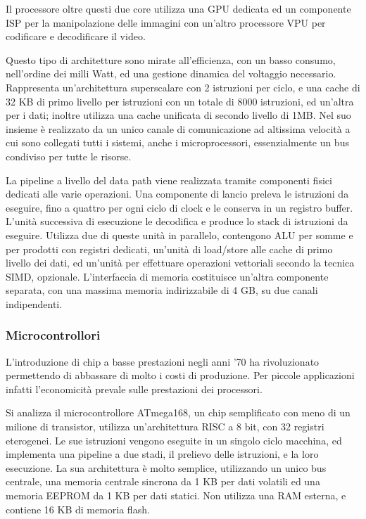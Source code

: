 \documentclass{article}
\numberwithin{equation}{subsection}
\begin{document}
Il processore oltre questi due core utilizza una GPU dedicata ed un componente ISP per la manipolazione delle immagini con un'altro processore VPU per codificare e decodificare il video. 

Questo tipo di architetture sono mirate all'efficienza, con un basso consumo, nell'ordine dei milli Watt, ed una gestione dinamica del voltaggio necessario. 
Rappresenta un'architettura superscalare con 2 istruzioni per ciclo, e una cache di 32 KB di primo livello per istruzioni con un totale di 8000 istruzioni, ed un'altra per i dati; inoltre 
utilizza una cache unificata di secondo livello di 1MB. 
Nel suo insieme è realizzato da un unico canale di comunicazione ad altissima velocità a cui sono collegati tutti i sistemi, anche i microprocessori, essenzialmente un bus condiviso per 
tutte le risorse. 

La pipeline a livello del data path viene realizzata tramite componenti fisici dedicati alle varie operazioni. Una componente di lancio preleva le istruzioni da eseguire, fino a quattro 
per ogni ciclo di clock e le conserva in un registro buffer. L'unità successiva di esecuzione le decodifica e produce lo stack di istruzioni da eseguire. Utilizza due di queste unità in 
parallelo, contengono ALU per somme e per prodotti con registri dedicati, un'unità di load/store alle cache di primo livello dei dati, ed un'unità per effettuare operazioni vettoriali 
secondo la tecnica SIMD, opzionale. 
L'interfaccia di memoria costituisce un'altra componente separata, con una massima memoria indirizzabile di 4 GB, su due canali indipendenti.  

\subsubsection{Microcontrollori}

L'introduzione di chip a basse prestazioni negli anni '70 ha rivoluzionato permettendo di abbassare di molto i costi di produzione. Per piccole applicazioni infatti l'economicità prevale 
sulle prestazioni dei processori. 

Si analizza il microcontrollore ATmega168, un chip semplificato con meno di un milione di transistor, utilizza un'architettura RISC a 8 bit, con 32 registri eterogenei. Le 
sue istruzioni vengono eseguite in un singolo ciclo macchina, ed implementa una pipeline a due stadi, il prelievo delle istruzioni, e la loro esecuzione. 
La sua architettura è molto semplice, utilizzando un unico bus centrale, una memoria centrale sincrona da 1 KB per dati volatili ed una memoria EEPROM da 1 KB per dati statici. 
Non utilizza una RAM esterna, e contiene 16 KB di memoria flash. 
\end{document}
